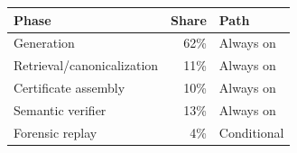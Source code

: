 \begin{minipage}[t]{0.49\linewidth}
\centering\footnotesize
\captionsetup{type=table}
\label{tab:protocol_cost}
\setlength{\tabcolsep}{2.2pt}
\renewcommand{\arraystretch}{1.10}
\begin{tabularx}{\linewidth}{@{}>{\raggedright\arraybackslash}Xr>{\raggedright\arraybackslash}p{.25\linewidth}@{}}
\toprule
Phase & Share & Path \\
\midrule
Generation & 62\% & Always on \\
Retrieval/canonicalization & 11\% & Always on \\
Certificate assembly & 10\% & Always on \\
Semantic verifier & 13\% & Always on \\
Forensic replay & 4\% & Conditional \\
\bottomrule
\end{tabularx}
\par\vspace{2pt}{\scriptsize Normalized PCG-MAS resource shares; forensic replay applies to audited/failed cases, not every direct path.}
\end{minipage}
